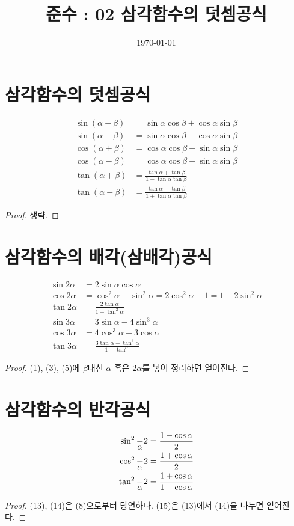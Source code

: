 \documentclass{article}
\renewcommand\a{\ensuremath{\alpha}}
\renewcommand\b{\ensuremath{\beta}}
\begin{document}
\title{준수 : 02 삼각함수의 덧셈공식}
\author{}
\date{\today}
\maketitle

\section{삼각함수의 덧셈공식}
\begin{align}
\sin(\a+\b)&=\sin\a\cos\b+\cos\a\sin\b\\
\sin(\a-\b)&=\sin\a\cos\b-\cos\a\sin\b\\
\cos(\a+\b)&=\cos\a\cos\b-\sin\a\sin\b\\
\cos(\a-\b)&=\cos\a\cos\b+\sin\a\sin\b\\
\tan(\a+\b)&=\frac{\tan\a+\tan\b}{1-\tan\a\tan\b}\\
\tan(\a-\b)&=\frac{\tan\a-\tan\b}{1+\tan\a\tan\b}
\end{align}
\begin{proof}
생략.
\end{proof}

\section{삼각함수의 배각(삼배각)공식}
\begin{align}
\sin2\a&=2\sin\a\cos\a\\
\cos2\a&=\cos^2\a-\sin^2\a=2\cos^2\a-1=1-2\sin^2\a\\
\tan2\a&=\frac{2\tan\a}{1-\tan^2\a}\\
\sin3\a&=3\sin\a-4\sin^3\a\\
\cos3\a&=4\cos^3\a-3\cos\a\\
\tan3\a&=\frac{3\tan\a-\tan^3\a}{1-\tan^\a}
\end{align}
\begin{proof}
(1), (3), (5)에 \b 대신 \(\a\) 혹은 \(2\a\)를 넣어 정리하면 얻어진다.
\end{proof}

\section{삼각함수의 반각공식}
\begin{align}
\sin^2\frac\a2&=\frac{1-\cos\a}2\\
\cos^2\frac\a2&=\frac{1+\cos\a}2\\
\tan^2\frac\a2&=\frac{1+\cos\a}{1-\cos\a}
\end{align}
\begin{proof}
(13), (14)은 (8)으로부터 당연하다.
(15)은 (13)에서 (14)을 나누면 얻어진다.
\end{proof}
\end{document}
